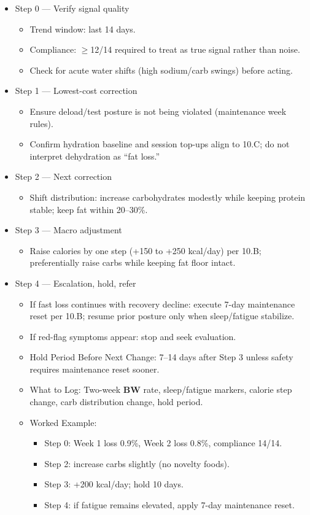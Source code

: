 \documentclass[10pt]{article}
\begin{document}
\begin{itemize}
\item Step 0 — Verify signal quality
  \begin{itemize}
  \item Trend window: last 14 days.
  \item Compliance: $\geq$12/14 required to treat as true signal rather than noise.
  \item Check for acute water shifts (high sodium/carb swings) before acting.
  \end{itemize}
\item Step 1 — Lowest-cost correction
  \begin{itemize}
  \item Ensure deload/test posture is not being violated (maintenance week rules).
  \item Confirm hydration baseline and session top-ups align to 10.C; do not interpret dehydration as “fat loss.”
  \end{itemize}
\item Step 2 — Next correction
  \begin{itemize}
  \item Shift distribution: increase carbohydrates modestly while keeping protein stable; keep fat within 20–30\%.
  \end{itemize}
\item Step 3 — Macro adjustment
  \begin{itemize}
  \item Raise calories by one step (+150 to +250 kcal/day) per 10.B; preferentially raise carbs while keeping fat floor intact.
  \end{itemize}
\item Step 4 — Escalation, hold, refer
  \begin{itemize}
  \item If fast loss continues with recovery decline: execute 7-day maintenance reset per 10.B; resume prior posture only when sleep/fatigue stabilize.
  \item If red-flag symptoms appear: stop and seek evaluation.
  \item Hold Period Before Next Change: 7–14 days after Step 3 unless safety requires maintenance reset sooner.
  \item What to Log: Two-week \textbf{BW} rate, sleep/fatigue markers, calorie step change, carb distribution change, hold period.
  \item Worked Example:
    \begin{itemize}
    \item Step 0: Week 1 loss 0.9\%, Week 2 loss 0.8\%, compliance 14/14.
    \item Step 2: increase carbs slightly (no novelty foods).
    \item Step 3: +200 kcal/day; hold 10 days.
    \item Step 4: if fatigue remains elevated, apply 7-day maintenance reset.
    \end{itemize}
  \end{itemize}
\end{itemize}
\end{document}
